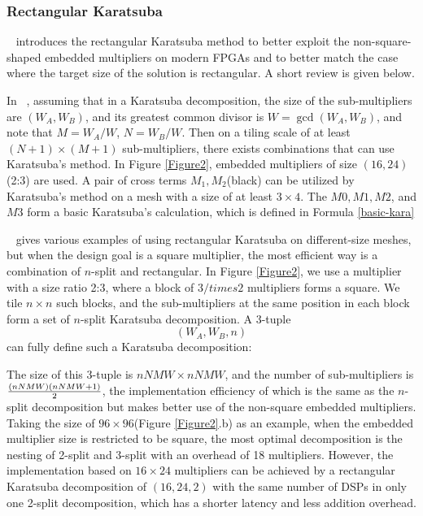 \documentclass[conference]{IEEEtran}
\begin{document}
\subsubsection{Rectangular Karatsuba}

~\cite{Karatsuba_with_Rectangular_Multipliers_for_FPGAs} introduces the rectangular Karatsuba method to better exploit the non-square-shaped embedded multipliers on modern FPGAs and to better match the case where the target size of the solution is rectangular. A short review is given below.

In ~\cite{Karatsuba_with_Rectangular_Multipliers_for_FPGAs}, assuming that in a Karatsuba decomposition, the size of the sub-multipliers are $\left(W_A, W_B\right)$, and its greatest common divisor is $W=\operatorname{gcd}\left(W_A, W_B\right)$, and note that $M=W_A / W$, $N=W_B / W$. Then on a tiling scale of at least $(N+1)\times (M+1)$ sub-multipliers, there exists combinations that can use Karatsuba's method. In Figure \ref{Figure2}, embedded multipliers of size  $(16,24)$ (2:3) are used.  A pair of cross terms $M_1, M_2$(black) can be utilized by Karatsuba's method on a mesh with a size of at least $3\times 4$. The $M0, M1, M2$, and $M3$ form a basic Karatsuba's calculation, which is defined in Formula \ref{basic-kara}

~\cite{Karatsuba_with_Rectangular_Multipliers_for_FPGAs} gives various examples of using rectangular Karatsuba on different-size meshes, but when the design goal is a square multiplier, the most efficient way is a combination of $n$-split and rectangular. In Figure \ref{Figure2}, we use a multiplier with a size ratio 2:3, where a block of $3/times 2$ multipliers forms a square. We tile $n \times n$ such blocks, and the sub-multipliers at the same position in each block form a set of $n$-split Karatsuba decomposition. A 3-tuple $$\left(W_A, W_B, n\right)$$ can fully define such a Karatsuba decomposition:

The size of this 3-tuple is $nNMW \times nNMW$, and the number of sub-multipliers is ${(nNMW)(nNMW+1)}\over 2$, the implementation efficiency of which is the same as the $n$-split decomposition but makes better use of the non-square embedded multipliers. Taking the size of $96 \times 96$(Figure \ref{Figure2}.b) as an example, when the embedded multiplier size is restricted to be square, the most optimal decomposition is the nesting of 2-split and 3-split with an overhead of 18 multipliers. However, the implementation based on $16\times24$ multipliers can be achieved by a rectangular Karatsuba decomposition of $(16,24,2)$ with the same number of DSPs in only one 2-split decomposition, which has a shorter latency and less addition overhead.
\end{document}
